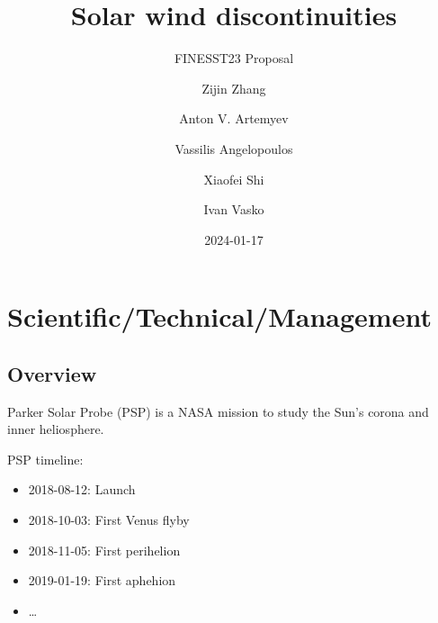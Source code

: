 \documentclass[
  letterpaper,
  DIV=11,
  numbers=noendperiod,
  oneside]{scrartcl}
\title{Solar wind discontinuities}
\subtitle{FINESST23 Proposal}
\author{Zijin Zhang \and Anton V. Artemyev \and Vassilis
Angelopoulos \and Xiaofei Shi \and Ivan Vasko}
\date{2024-01-17}
\providecommand{\tightlist}{%
  \setlength{\itemsep}{0pt}\setlength{\parskip}{0pt}}\usepackage{longtable,booktabs,array}
\begin{document}
\maketitle

\section{Scientific/Technical/Management}\label{scientifictechnicalmanagement}

\subsection{Overview}\label{overview}

Parker Solar Probe (PSP) is a NASA mission to study the Sun's corona and
inner heliosphere.

PSP timeline:

\begin{itemize}
\tightlist
\item
  2018-08-12: Launch
\item
  2018-10-03: First Venus flyby
\item
  2018-11-05: First perihelion
\item
  2019-01-19: First aphehion
\item
  \ldots{}
\end{itemize}
\end{document}
